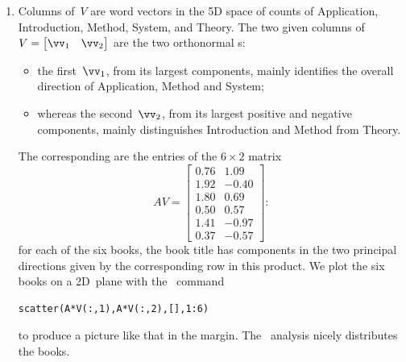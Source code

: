 \begin{enumerate}
\item Columns of~\(V\) are word vectors in the 5D space of counts of Application, Introduction, Method, System, and Theory.
The two given columns of \(V=\begin{bmatrix} \vv_1&\vv_2 \end{bmatrix}\) are the two orthonormal s:
\begin{itemize}
\item the first~\(\vv_1\), from its largest components, mainly identifies the overall direction of Application, Method and System;
\item whereas the second~\(\vv_2\), from its largest positive and negative components, mainly distinguishes Introduction and Method from Theory.
\end{itemize}
The corresponding  are the entries of the \(6\times 2\) matrix
\begin{equation*}
AV=\begin{bmatrix} 0.76 & 1.09 \\
1.92 & -0.40 \\
1.80 & 0.69 \\
0.50 & 0.57 \\
1.41 & -0.97 \\
0.37 & -0.57 \end{bmatrix}:
\end{equation*}
for each of the six books, the book title has components in the two principal directions given by the corresponding row in this product.
We plot the six books on a 2D~plane with the \script\ command
\begin{verbatim}
scatter(A*V(:,1),A*V(:,2),[],1:6)
\end{verbatim}
to produce a picture like that in the margin.
The \svd\ analysis nicely distributes the books.
\end{enumerate}


